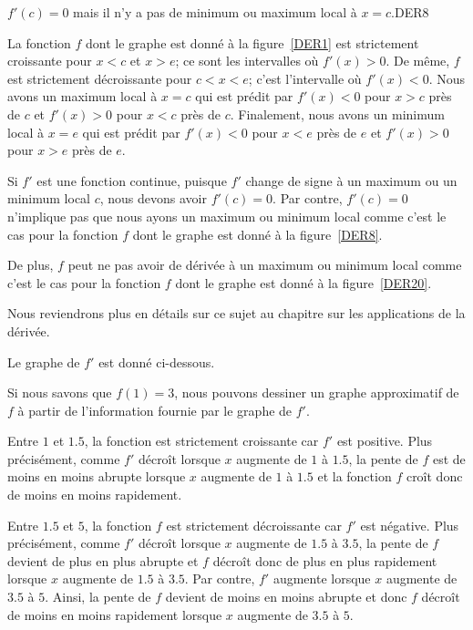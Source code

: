 {
{$f'(c)=0$ mais il n'y a pas de minimum ou maximum local à $x=c$.}{DER8}

\begin{egg}
La fonction $f$ dont le graphe est donné à la figure~\ref{DER1} est
strictement croissante pour $x<c$ et $x>e$; ce sont les intervalles où
$f'(x)>0$.  De même, $f$ est strictement décroissante pour $c<x<e$;
c'est l'intervalle où $f'(x)<0$.  Nous avons un maximum local à $x=c$
qui est prédit par $f'(x)<0$ pour $x>c$ près de $c$ et $f'(x)>0$ pour
$x<c$ près de $c$.  Finalement, nous avons un minimum local à $x=e$
qui est prédit par $f'(x)<0$ pour $x<e$ près de $e$ et $f'(x)>0$ pour
$x>e$ près de $e$.
\end{egg}

\begin{rmk}
Si $f'$ est une fonction continue, puisque $f'$ change de signe à un
maximum ou un minimum local $c$, nous devons avoir $f'(c)=0$.  Par contre,
$f'(c)=0$ n'implique pas que nous ayons un maximum ou minimum local
comme c'est le cas pour la fonction $f$ dont le graphe est donné à la
figure~\ref{DER8}.

De plus, $f$ peut ne pas avoir de dérivée à un maximum ou minimum
local comme c'est le cas pour la fonction $f$ dont le graphe est
donné à la figure~\ref{DER20}.

Nous reviendrons plus en détails sur ce sujet au chapitre sur les
applications de la dérivée.
\label{rmk_crpt}
\end{rmk}


\begin{egg}
Le graphe de $f'$ est donné ci-dessous.

Si nous savons que $f(1) = 3$, nous pouvons dessiner un graphe approximatif de
$f$ à partir de l'information fournie par le graphe de $f'$.

Entre $1$ et $1.5$, la fonction est strictement croissante car $f'$
est positive.  Plus précisément, comme $f'$ décroît lorsque $x$
augmente de $1$ à $1.5$, la pente de $f$ est de moins en moins abrupte
lorsque $x$ augmente de $1$ à $1.5$ et la fonction $f$ croît donc de
moins en moins rapidement.

Entre $1.5$ et $5$, la fonction $f$ est strictement décroissante car
$f'$ est négative.  Plus précisément, comme $f'$ décroît lorsque $x$
augmente de $1.5$ à $3.5$, la pente de $f$ devient de plus en plus
abrupte et $f$ décroît donc de plus en plus rapidement lorsque $x$
augmente de $1.5$ à $3.5$.  Par contre, $f'$ augmente lorsque $x$
augmente de $3.5$ à $5$.  Ainsi, la pente de $f$ devient de moins en
moins abrupte et donc $f$ décroît de moins en moins rapidement lorsque
$x$ augmente de $3.5$ à $5$.


\end{egg}}
